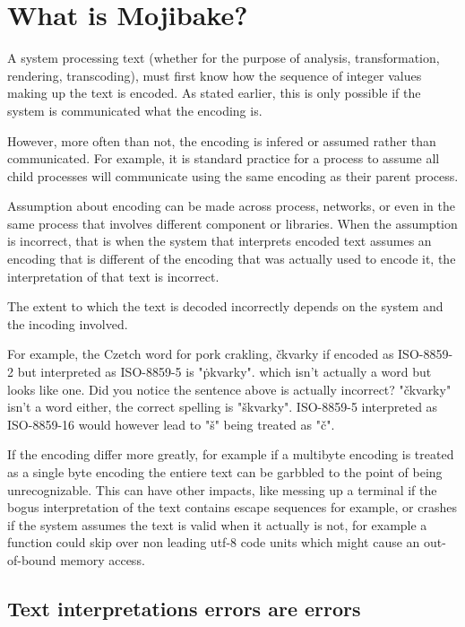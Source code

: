 \documentclass{wg21}
\begin{document}
\section{What is Mojibake?}

A system processing text (whether for the purpose of analysis, transformation, rendering, transcoding),
must first know how the sequence of integer values making up the text is encoded.
As stated earlier, this is only possible if the system is communicated what the encoding is.

However, more often than not, the encoding is infered or assumed rather than communicated.
For example, it is standard practice for a process to assume all child processes will communicate using the same
encoding as their parent process.

Assumption about encoding can be made across process, networks, or even in the same process that involves different component or libraries.
When the assumption is incorrect, that is when the system that interprets encoded text assumes an encoding that is different
of the encoding that was actually used to encode it, the interpretation of that text is incorrect.

The extent to which the text is decoded incorrectly depends on the system and the incoding involved.

For example, the Czetch word for pork crakling,
čkvarky if encoded as ISO-8859-2 but interpreted as
ISO-8859-5 is "ṗkvarky". which isn't actually a word but looks like one.
Did you notice the sentence above is actually incorrect? "čkvarky" isn't a word either, the correct spelling is "škvarky".
ISO-8859-5 interpreted as ISO-8859-16 would however lead to
"š" being treated as "č".

If the encoding differ more greatly, for example if
a multibyte encoding is treated as a single byte encoding
the entiere text can be garbbled to the point of being unrecognizable.
This can have other impacts, like messing up a terminal
if the bogus interpretation of the text contains escape sequences for example, or crashes if the system assumes
the text is valid when it actually is not, for example
a function could skip over non leading utf-8 code units
which might cause an out-of-bound memory access.

\subsection{Text interpretations errors are errors}
\end{document}
